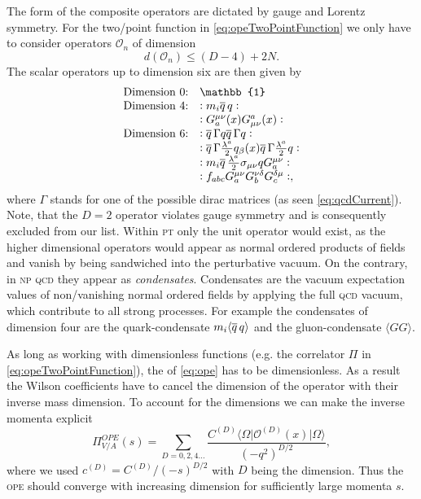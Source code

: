 \documentclass[../../index.tex]{subfiles}
\begin{document}
The form of the composite operators are dictated by gauge and Lorentz symmetry.
For the two\-/point function in \cref{eq:opeTwoPointFunction} we only have to
consider operators \(\mathcal{O}_n\) of dimension
\begin{equation}
  d \left( \mathcal{O}_n \right) \leq (D - 4) + 2N.
\end{equation}
The scalar operators up to dimension six are then given by \cite{Pascual1984}
\begin{equation}
  \begin{array}{ll}
    \text{Dimension 0:} & \mathbb{1} \\
    \text{Dimension 4:} & :m_i \anti{q} q: \\
                        & :G_a^{\mu\nu}(x) G_{\mu\nu}^a(x): \\
    \text{Dimension 6:} & :\anti{q} \Gamma q \anti{q} \Gamma q: \\
                        & :\anti{q} \Gamma \frac{\lambda^a}{2} q_\beta(x) \anti{q} \Gamma \frac{\lambda^a}{2} q: \\
                        & :m_i \anti{q} \frac{\lambda^a}{2} \sigma_{\mu\nu} q G^{\mu\nu}_a: \\
                        & :f_{abc} G_a^{\mu\nu} G_b^{\nu\delta} G_c^{\delta\mu}:,
  \end{array}
\end{equation}
where \(\Gamma\) stands for one of the possible dirac matrices (as seen
\cref{eq:qcdCurrent}). Note, that the \(D=2\) operator violates gauge symmetry
and is consequently excluded from our list. Within \textsc{pt} only the unit
operator would exist, as the higher dimensional operators would appear as normal
ordered products of fields and vanish by being sandwiched into the perturbative
vacuum. On the contrary, in \textsc{np qcd} they appear as \textit{condensates}.
Condensates are the vacuum expectation values of non\-/vanishing normal ordered
fields by applying the full \textsc{qcd} vacuum, which contribute to all strong
processes. For example the condensates of dimension four are the
quark-condensate \(m_i\langle \overline{q}\, q \rangle\) and the gluon-condensate
\(\langle GG \rangle\).

As long as working with dimensionless functions (e.g. the correlator \(\Pi\) in
\cref{eq:opeTwoPointFunction}), the  of
\cref{eq:ope} has to be dimensionless. As a result the Wilson coefficients have
to cancel the dimension of the operator with their inverse mass dimension. To
account for the dimensions we can make the inverse momenta explicit
\begin{equation}
  \Pi_{V/A}^{OPE}(s) = \sum_{D=0,2,4\dots} \frac{C^{(D)}
    \langle\Omega\vert \mathcal{O}^{(D)}(x) \vert\Omega\rangle}{(-q^2)^{D/2}},
\end{equation}
where we used \(c^{(D)}=C^{(D)}/(-s)^{D/2}\) with \(D\) being the dimension.
Thus the \textsc{ope} should converge with increasing dimension for sufficiently
large momenta \(s\).
\end{document}
